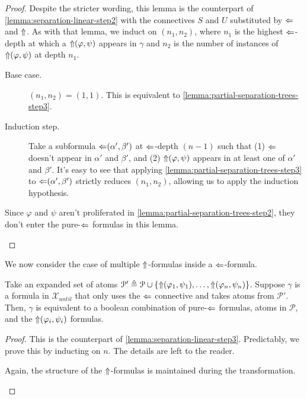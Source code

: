 \documentclass[a4paper,UKenglish,cleveref, autoref, thm-restate, numberwithinsect]{lipics-v2021}
\def\Larrow{\ensuremath\mathord{\Leftarrow}}
\def\Uarrow{\ensuremath\mathord{\Uparrow}}
\begin{document}
\begin{proof}
    Despite the stricter wording, this lemma is the counterpart of \cref{lemma:separation-linear-step2} with the connectives $S$ and $U$ substituted by $\Larrow$ and $\Uarrow$. As with that lemma, we induct on $(n_1, n_2)$, where $n_1$ is the highest $\Larrow$-depth at which a $\Uarrow(\varphi, \psi)$ appears in $\gamma$ and $n_2$ is the number of instances of $\Uarrow(\varphi, \psi)$ at depth $n_1$.
    \begin{description}
        \item[Base case.] $(n_1, n_2) = (1, 1)$. This is equivalent to \cref{lemma:partial-separation-trees-step3}.
        \item[Induction step.] Take a subformula $\Larrow(\alpha', \beta')$ at $\Larrow$-depth $(n-1)$ such that (1) $\Larrow$ doesn't appear in $\alpha'$ and $\beta'$, and (2) $\Uarrow(\varphi, \psi)$ appears in at least one of $\alpha'$ and $\beta'$. It's easy to see that applying \cref{lemma:partial-separation-trees-step3} to $\Larrow(\alpha', \beta')$ strictly reduces $(n_1, n_2)$, allowing us to apply the induction hypothesis.
    \end{description}
    \begin{remark*}
        Since $\varphi$ and $\psi$ aren't proliferated in \cref{lemma:partial-separation-trees-step2}, they don't enter the pure-$\Larrow$ formulas in this lemma.
    \end{remark*}
\end{proof}
We now consider the case of multiple $\Uarrow$-formulas inside a $\Larrow$-formula.
\begin{lemma}
    \label{lemma:partial-separation-trees-step5}
    Take an expanded set of atoms $\mathcal{P}' \triangleq \mathcal{P} \cup \{\Uarrow(\varphi_1, \psi_1), \ldots, \Uarrow(\varphi_n, \psi_n)\}$. Suppose $\gamma$ is a formula in $\mathcal{X}_{until}$ that only uses the $\Larrow$ connective and takes atoms from $\mathcal{P}'$. Then, $\gamma$ is equivalent to a boolean combination of pure-$\Larrow$ formulas, atoms in $\mathcal{P}$, and the $\Uarrow(\varphi_i, \psi_i)$ formulas.
\end{lemma}
\begin{proof}
    This is the counterpart of \cref{lemma:separation-linear-step3}. Predictably, we prove this by inducting on $n$. The details are left to the reader. %
    \begin{remark*}
        Again, the structure of the $\Uarrow$-formulas is maintained during the transformation.
    \end{remark*}
\end{proof}
\end{document}
